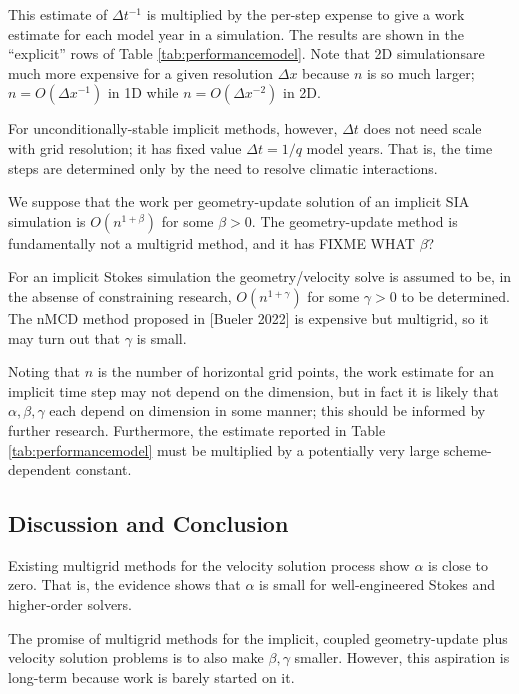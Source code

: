 \documentclass[twocolumn,letterpaper]{igs}
\begin{document}
This estimate of $\Delta t^{-1}$ is multiplied by the per-step expense to give a work estimate for each model year in a simulation.  The results are shown in the ``explicit'' rows of Table \ref{tab:performancemodel}.  Note that 2D simulationsare much more expensive for a given resolution $\Delta x$ because $n$ is so much larger; $n = O(\Delta x^{-1})$ in 1D while $n = O(\Delta x^{-2})$ in 2D.

For unconditionally-stable implicit methods, however, $\Delta t$ does not need scale with grid resolution; it has fixed value $\Delta t = 1/q$ model years.  That is, the time steps are determined only by the need to resolve climatic interactions.

We suppose that the work per geometry-update solution of an implicit SIA simulation is $O(n^{1+\beta})$ for some $\beta>0$.  The \cite{Bueler2016} geometry-update method is fundamentally not a multigrid method, and it has FIXME WHAT $\beta$?

For an implicit Stokes simulation the geometry/velocity solve is assumed to be, in the absense of constraining research, $O(n^{1+\gamma})$ for some $\gamma>0$ to be determined.  The nMCD method proposed in [Bueler 2022] is expensive but multigrid, so it may turn out that $\gamma$ is small.

Noting that $n$ is the number of horizontal grid points, the work estimate for an implicit time step may not depend on the dimension, but in fact it is likely that $\alpha,\beta,\gamma$ each depend on dimension in some manner; this should be informed by further research.  Furthermore, the estimate reported in Table \ref{tab:performancemodel} must be multiplied by a potentially very large scheme-dependent constant.

\subsection{Discussion and Conclusion}

Existing multigrid methods for the velocity solution process show $\alpha$ is close to zero.  That is, the evidence shows that $\alpha$ is small for well-engineered Stokes \citep{IsaacStadlerGhattas2015} and higher-order \citep{BrownSmithAhmadia2013} solvers.

The promise of multigrid methods for the implicit, coupled geometry-update plus velocity solution problems is to also make $\beta,\gamma$ smaller.  However, this aspiration is long-term because work is barely started on it.



\end{document}
